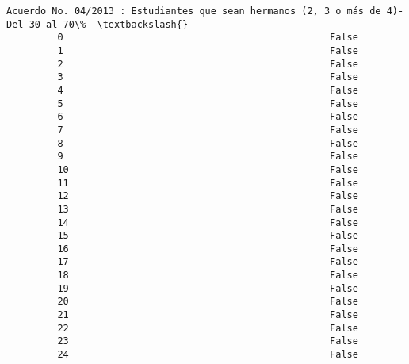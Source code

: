 \documentclass[11pt]{article}
\begin{document}
\begin{Verbatim}[commandchars=\\\{\}]
             Acuerdo No. 04/2013 : Estudiantes que sean hermanos (2, 3 o más de 4)-Del 30 al 70\%  \textbackslash{}
         0                                               False                                     
         1                                               False                                     
         2                                               False                                     
         3                                               False                                     
         4                                               False                                     
         5                                               False                                     
         6                                               False                                     
         7                                               False                                     
         8                                               False                                     
         9                                               False                                     
         10                                              False                                     
         11                                              False                                     
         12                                              False                                     
         13                                              False                                     
         14                                              False                                     
         15                                              False                                     
         16                                              False                                     
         17                                              False                                     
         18                                              False                                     
         19                                              False                                     
         20                                              False                                     
         21                                              False                                     
         22                                              False                                     
         23                                              False                                     
         24                                              False                                     

\end{Verbatim}
\end{document}
